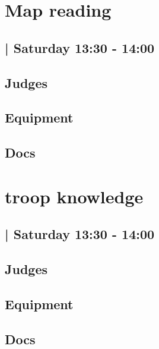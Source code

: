\documentclass[10pt]{article}
\begin{document}
		\begin{minipage}{\linewidth}
		\setcounter{section}{36}
	\section{Map reading }
	\subsection*{ | Saturday 13:30 - 14:00}

	

	\begin{multicols}{2}
	\subsection*{\faUsers \: Judges}
	\begin{itemize}
		\end{itemize}
	\columnbreak
	\subsection*{\faWrench \: Equipment}
	        \vfill\null
        \subsection*{\faFile \: Docs}
     	\end{multicols}


	\vspace{1cm}
	\end{minipage}

		\begin{minipage}{\linewidth}
		\setcounter{section}{37}
	\section{troop knowledge }
	\subsection*{ | Saturday 13:30 - 14:00}

	

	\begin{multicols}{2}
	\subsection*{\faUsers \: Judges}
	\begin{itemize}
		\end{itemize}
	\columnbreak
	\subsection*{\faWrench \: Equipment}
	        \vfill\null
        \subsection*{\faFile \: Docs}
     	\end{multicols}


	\vspace{1cm}
	\end{minipage}
\end{document}
